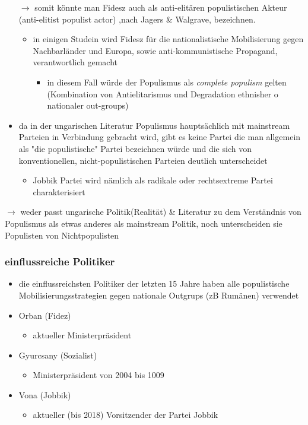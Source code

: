\documentclass[11pt]{article}
\begin{document}
\begin{itemize}
\begin{itemize}
\begin{itemize}
\end{itemize}
\end{itemize}
\(\rightarrow\) somit könnte man Fidesz auch als anti-elitären populistischen Akteur (anti-elitist populist actor) ,nach Jagers \& Walgrave, bezeichnen.
\begin{itemize}
\item in einigen Studein wird Fidesz für die nationalistische Mobilisierung gegen Nachbarländer und Europa, sowie anti-kommunistische Propagand, verantwortlich gemacht
\begin{itemize}
\item in diesem Fall würde der Populismus als \emph{complete populism} gelten (Kombination von Antielitarismus und Degradation ethnisher o nationaler out-groups)
\end{itemize}
\end{itemize}

\item da in der ungarischen Literatur Populismus hauptsächlich mit mainstream Parteien in Verbindung gebracht wird, gibt es keine Partei die man allgemein als "die populistische" Partei bezeichnen würde und die sich von konventionellen, nicht-populistischen Parteien deutlich unterscheidet
\begin{itemize}
\item Jobbik Partei wird nämlich als radikale oder rechtsextreme Partei charakterisiert
\end{itemize}
\end{itemize}
\(\rightarrow\) weder passt ungarische Politik(Realität) \& Literatur zu dem Verständnis von Populismus als etwas anderes als mainstream Politik, noch unterscheiden sie Populisten von Nichtpopulisten

\subsubsection{einflussreiche Politiker}
\label{sec:org80199c0}
\begin{itemize}
\item die einflussreichsten Politiker der letzten 15 Jahre haben alle populistische Mobilisierungsstrategien gegen nationale Outgrups (zB Rumänen) verwendet
\item Orban (Fidez)
\begin{itemize}
\item aktueller Ministerpräsident
\end{itemize}

\item Gyurcsany (Sozialist)
\begin{itemize}
\item Ministerpräsident von 2004 bis 1009
\end{itemize}

\item Vona (Jobbik)
\begin{itemize}
\item aktueller (bis 2018) Vorsitzender der Partei Jobbik
\end{itemize}
\end{itemize}
\end{document}
